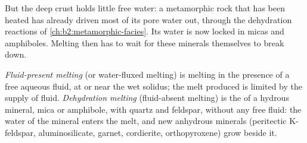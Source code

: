 \begin{omfigure}
\centering
{}
\par{}
\end{omfigure}

But the deep crust holds little free water: a metamorphic rock that has been heated has
already driven most of its pore water out, through the dehydration reactions of
\cref{ch:b2:metamorphic-facies}. Its water is now locked in micas and amphiboles. Melting
then has to wait for these minerals themselves to break down.

\begin{definition}\label{def:b2:crustal-melting:reactions}
\emph{Fluid-present melting} (or water-fluxed melting) is
melting in the presence of a free aqueous fluid, at or near the wet solidus; the melt
produced is limited by the supply of fluid. \emph{Dehydration melting} (fluid-absent melting) is the  of a hydrous mineral, mica or
amphibole, with quartz and feldspar, without any free fluid: the water of the mineral
enters the melt, and new anhydrous minerals (peritectic K-feldspar, aluminosilicate,
garnet, cordierite, orthopyroxene) grow beside it.
\end{definition}

